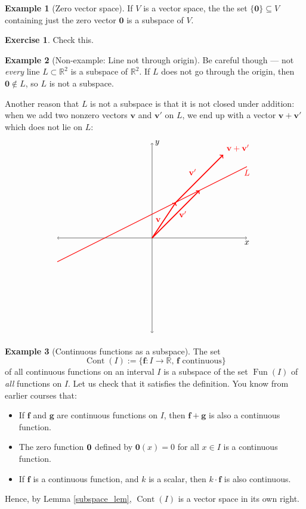 \documentclass[a4paper,11pt]{book}
\theoremstyle{definition}
\newtheorem{exercise}{Exercise}
\newtheorem{example_environment}{Example}[chapter]
\newcommand{\be}{\begin{equation}}
\newcommand{\ee}{\end{equation}}
\newcommand{\ba}{\begin{aligned}}
\newcommand{\ea}{\end{aligned}}
\newcommand{\ve}[1]{\mathbf{#1}}
\newenvironment{example}
	{
		\begin{oframed} 
		\begin{example_environment}
	}
	{
		\end{example_environment}
		\end{oframed}
	}
\DeclareMathOperator{\Fun}{Fun}
\DeclareMathOperator{\Cont}{Cont}
\begin{document}
\begin{example}[Zero vector space] If $V$ is a vector space, the the set $
\{\ve{0}\} \subseteq V$ containing just the zero vector $\ve{0}$ is a subspace of $V$.
\begin{exercise} Check this.
\end{exercise}
\end{example}

\begin{example}[Non-example: Line not through origin] Be careful though --- not {\em every} line $L \subset \mathbb{R}^2$ is a subspace of $\mathbb{R}^2$. If $L$ does not go through the origin, then $\ve{0} \notin L$, so $L$ is not a subspace. 

Another reason that $L$ is not a subspace is that it is not closed under addition: when we add two nonzero vectors $\ve{v}$ and $\ve{v}'$ on $L$, we end up with a vector $\ve{v} + \ve{v}'$ which does not lie on $L$:
\be \label{pic_of_bad_L}
\ba
\begin{tikzpicture}[scale=2]
	\draw[<->] (-2, 0) -- (2,0) node[below] {$x$};
	\draw[<->] (0, -2) -- (0, 2) node[right] {$y$};
	\draw[thick, red] (-2, -0.5) -- (2, 1.5) node[below] {$L$};
	\draw[very thick, red, ->] (0,0) -- node[left] {$\ve{v}$} (0.5, 0.75);
	\draw[very thick, red, ->] (0,0) -- node[right] {$\ve{v}'$} (1, 1);
	\draw[very thick, red, ->] (0.5,0.75) -- node[above left] {$\ve{v}'$} (1.5, 1.75) node[above right] {$\ve{v} + \ve{v}'$};
\end{tikzpicture}
\ea
\ee
\end{example}



\begin{example}[Continuous functions as a subspace] The set 
\[
 \Cont(I) := \{ \ve{f}: I \rightarrow \mathbb{R}, \, \ve{f} \mbox{ continuous} \}
 \]
of all continuous functions on an interval $I$ is a subspace of the set $\Fun(I)$ of {\em all} functions on $I$. Let us check that it satisfies the definition. You know from earlier courses that:
\begin{itemize}
\item If $\ve{f}$ and $\ve{g}$ are continuous functions on $I$, then $\ve{f} + \ve{g}$ is also a continuous function. 
\item The zero function $\bf{0}$ defined by $\ve{0}(x) = 0$ for all $x \in I$ is a continuous function.
\item If $\ve{f}$ is a continuous function, and $k$ is a scalar, then $k \cdot \ve{f}$ is also continuous.
\end{itemize}
Hence, by Lemma \ref{subspace_lem}, $\Cont(I)$ is a vector space in its own right.
\end{example}
\end{document}
